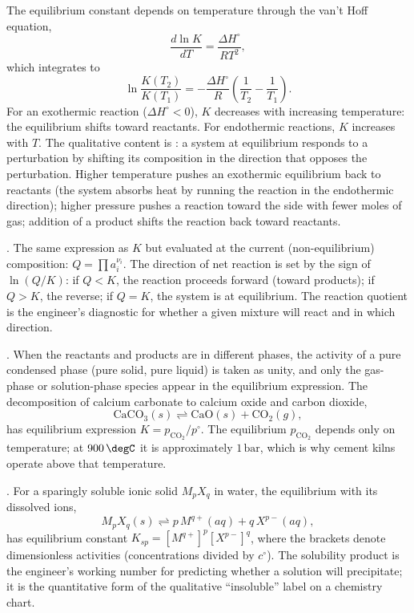 The equilibrium constant depends on temperature through the
van't Hoff equation,
\[
\frac{d \ln K}{d T} = \frac{\Delta H^\circ}{R T^2},
\]
which integrates to
\[
\ln\frac{K(T_2)}{K(T_1)} = -\frac{\Delta H^\circ}{R}\left(\frac{1}{T_2}
- \frac{1}{T_1}\right).
\]
For an exothermic reaction ($\Delta H^\circ < 0$), $K$ decreases with
increasing temperature: the equilibrium shifts toward reactants. For
endothermic reactions, $K$ increases with $T$. The qualitative
content is : a system at equilibrium
responds to a perturbation by shifting its composition in the direction
that opposes the perturbation. Higher temperature pushes an
exothermic equilibrium back to reactants (the system absorbs heat by
running the reaction in the endothermic direction); higher pressure
pushes a reaction toward the side with fewer moles of gas; addition
of a product shifts the reaction back toward reactants.

. The same expression as $K$ but evaluated
at the current (non-equilibrium) composition: $Q = \prod a_i^{\nu_i}$.
The direction of net reaction is set by the sign of $\ln(Q/K)$: if
$Q < K$, the reaction proceeds forward (toward products); if $Q > K$,
the reverse; if $Q = K$, the system is at equilibrium. The reaction
quotient is the engineer's diagnostic for whether a given mixture
will react and in which direction.

. When the reactants and products
are in different phases, the activity of a pure condensed phase
(pure solid, pure liquid) is taken as unity, and only the gas-phase
or solution-phase species appear in the equilibrium expression. The
decomposition of calcium carbonate to calcium oxide and carbon
dioxide,
\[
\text{CaCO}_3(s) \rightleftharpoons \text{CaO}(s) + \text{CO}_2(g),
\]
has equilibrium expression $K = p_{\text{CO}_2}/p^\circ$. The
equilibrium $p_{\text{CO}_2}$ depends only on temperature; at
$900\,\degC$ it is approximately $1\,\text{bar}$, which is why
cement kilns operate above that temperature.

. For a sparingly soluble ionic solid
$M_pX_q$ in water, the equilibrium with its dissolved ions,
\[
M_pX_q(s) \rightleftharpoons p\,M^{q+}(aq) + q\,X^{p-}(aq),
\]
has equilibrium constant $K_{sp} = [M^{q+}]^p [X^{p-}]^q$, where the
brackets denote dimensionless activities (concentrations divided by
$c^\circ$). The solubility product is the engineer's working number
for predicting whether a solution will precipitate; it is the
quantitative form of the qualitative ``insoluble'' label on a
chemistry chart.

